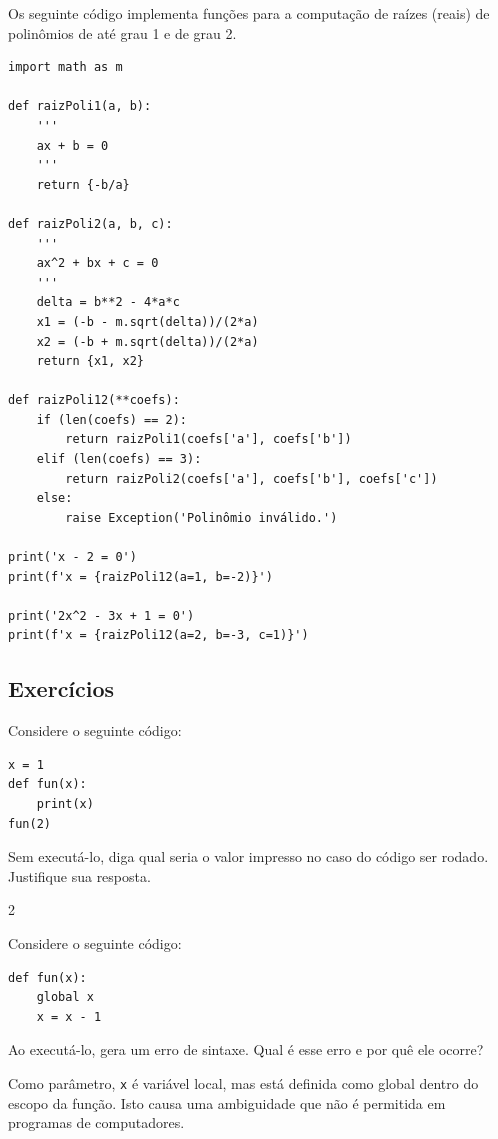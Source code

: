 \begin{ex}
  Os seguinte código implementa funções para a computação de raízes (reais) de polinômios de até grau 1 e de grau 2.

\begin{lstlisting}
import math as m

def raizPoli1(a, b):
    '''
    ax + b = 0
    '''
    return {-b/a}

def raizPoli2(a, b, c):
    '''
    ax^2 + bx + c = 0
    '''
    delta = b**2 - 4*a*c
    x1 = (-b - m.sqrt(delta))/(2*a)
    x2 = (-b + m.sqrt(delta))/(2*a)
    return {x1, x2}

def raizPoli12(**coefs):
    if (len(coefs) == 2):
        return raizPoli1(coefs['a'], coefs['b'])
    elif (len(coefs) == 3):
        return raizPoli2(coefs['a'], coefs['b'], coefs['c'])
    else:
        raise Exception('Polinômio inválido.')

print('x - 2 = 0')
print(f'x = {raizPoli12(a=1, b=-2)}')

print('2x^2 - 3x + 1 = 0')
print(f'x = {raizPoli12(a=2, b=-3, c=1)}')
\end{lstlisting}

\end{ex}

\subsection{Exercícios}

\begin{exer}
  Considere o seguinte código:

\begin{lstlisting}
x = 1
def fun(x):
    print(x)
fun(2)
\end{lstlisting}
  
Sem executá-lo, diga qual seria o valor impresso no caso do código ser rodado. Justifique sua resposta.
\end{exer}
\begin{resp}
  2
\end{resp}

\begin{exer}
  Considere o seguinte código:

\begin{lstlisting}
def fun(x):
    global x
    x = x - 1
\end{lstlisting}
  
Ao executá-lo, {\python} gera um erro de sintaxe. Qual é esse erro e por quê ele ocorre?
\end{exer}
\begin{resp}
  Como parâmetro, \lstinline+x+ é variável local, mas está definida como global dentro do escopo da função. Isto causa uma ambiguidade que não é permitida em programas de computadores.
\end{resp}

